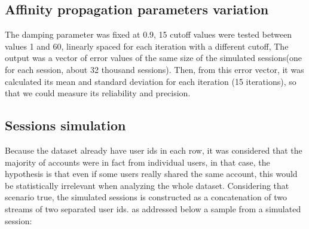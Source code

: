 \documentclass[ecp,tc,english]{iiufrgs}
\begin{document}
        \subsection{Affinity propagation parameters variation}
        The damping parameter was fixed at 0.9,
        15 cutoff values were tested between values 1 and 60, linearly spaced for each iteration with a different cutoff, 
        The output was a vector of error values of the same size of the simulated sessions(one for each session, about 32 thousand sessions).
        Then, from this error vector, it was calculated its mean and standard deviation for each iteration (15 iterations), so that we could measure its reliability and precision.
        
        \subsection{Sessions simulation}
        Because the dataset already have user ids in each row, it was considered that the majority of accounts were in fact from individual users, in that case, the hypothesis is that even if some users really shared the same account, this would be statistically irrelevant when analyzing the whole dataset.
        Considering that scenario true, the simulated sessions is constructed as a concatenation of two streams of two separated user ids.
        as addressed below a sample from a simulated session:
        
\end{document}
